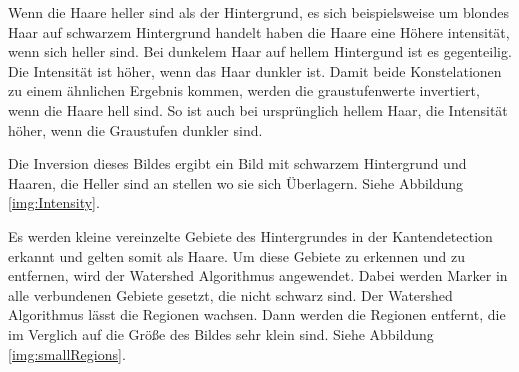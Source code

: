 \documentclass[german,a4paper, 12pt]{scrartcl}
\begin{document}
Wenn die Haare heller sind als der Hintergrund, es sich beispielsweise um blondes Haar auf schwarzem Hintergrund handelt haben die Haare eine Höhere intensität, wenn sich heller sind. Bei dunkelem Haar auf hellem Hintergund ist es gegenteilig. Die Intensität ist höher, wenn das Haar dunkler ist.
Damit beide Konstelationen zu einem ähnlichen Ergebnis kommen, werden die graustufenwerte invertiert, wenn die Haare hell sind. So ist auch bei ursprünglich hellem Haar, die Intensität höher, wenn die Graustufen dunkler sind.



Die Inversion dieses Bildes ergibt ein Bild mit schwarzem Hintergrund und Haaren, die Heller sind an stellen wo sie sich Überlagern. Siehe Abbildung \ref{img:Intensity}.


Es werden kleine vereinzelte Gebiete des Hintergrundes in der Kantendetection erkannt und gelten somit als Haare.
Um diese Gebiete zu erkennen und zu entfernen, wird der Watershed Algorithmus angewendet.   
Dabei werden Marker in alle verbundenen Gebiete gesetzt, die nicht schwarz sind. Der Watershed Algorithmus lässt die Regionen wachsen. 
Dann werden die Regionen entfernt, die im Verglich auf die Größe des Bildes sehr klein sind. Siehe Abbildung \ref{img:smallRegions}.
\end{document}
